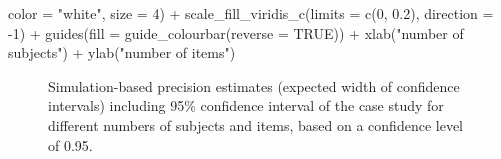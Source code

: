 \documentclass[
  man,
  floatsintext,
  longtable,
  a4paper,
  nolmodern,
  notxfonts,
  notimes,
  colorlinks=true,linkcolor=blue,citecolor=blue,urlcolor=blue]{apa7}
\newenvironment{Shaded}{\begin{snugshade}}{\end{snugshade}}
\newcommand{\AttributeTok}[1]{\textcolor[rgb]{0.40,0.45,0.13}{#1}}
\newcommand{\ConstantTok}[1]{\textcolor[rgb]{0.56,0.35,0.01}{#1}}
\newcommand{\DecValTok}[1]{\textcolor[rgb]{0.68,0.00,0.00}{#1}}
\newcommand{\FloatTok}[1]{\textcolor[rgb]{0.68,0.00,0.00}{#1}}
\newcommand{\FunctionTok}[1]{\textcolor[rgb]{0.28,0.35,0.67}{#1}}
\newcommand{\NormalTok}[1]{\textcolor[rgb]{0.00,0.23,0.31}{#1}}
\newcommand{\SpecialCharTok}[1]{\textcolor[rgb]{0.37,0.37,0.37}{#1}}
\newcommand{\StringTok}[1]{\textcolor[rgb]{0.13,0.47,0.30}{#1}}
\begin{document}
\begin{Shaded}
\begin{Highlighting}[]
    \AttributeTok{color =} \StringTok{"white"}\NormalTok{, }\AttributeTok{size =} \DecValTok{4}\NormalTok{) }\SpecialCharTok{+}
  \FunctionTok{scale\_fill\_viridis\_c}\NormalTok{(}\AttributeTok{limits =} \FunctionTok{c}\NormalTok{(}\DecValTok{0}\NormalTok{, }\FloatTok{0.2}\NormalTok{), }\AttributeTok{direction =} \SpecialCharTok{{-}}\DecValTok{1}\NormalTok{) }\SpecialCharTok{+}
  \FunctionTok{guides}\NormalTok{(}\AttributeTok{fill =} \FunctionTok{guide\_colourbar}\NormalTok{(}\AttributeTok{reverse =} \ConstantTok{TRUE}\NormalTok{)) }\SpecialCharTok{+}
  \FunctionTok{xlab}\NormalTok{(}\StringTok{"number of subjects"}\NormalTok{) }\SpecialCharTok{+} \FunctionTok{ylab}\NormalTok{(}\StringTok{"number of items"}\NormalTok{)}
\end{Highlighting}
\end{Shaded}

\begin{figure}[H]

\caption{\label{fig-finalprecision}Simulation-based precision estimates
(expected width of confidence intervals) including 95\% confidence
interval of the case study for different numbers of subjects and items,
based on a confidence level of 0.95.}


\end{figure}%
\end{document}
